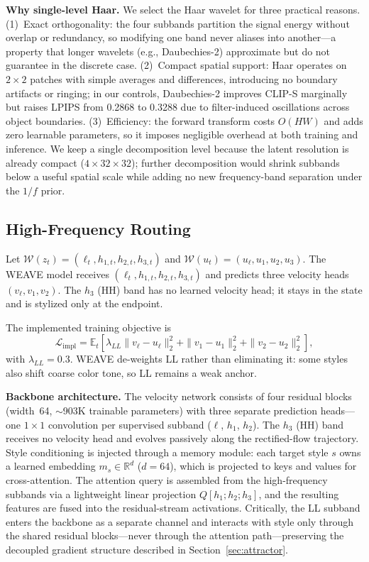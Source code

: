 \documentclass[letterpaper]{article}
\begin{document}
\textbf{Why single-level Haar.}
We select the Haar wavelet for three practical reasons.
(1)~Exact orthogonality: the four subbands partition the signal energy without overlap or redundancy, so modifying one band never aliases into another---a property that longer wavelets (e.g., Daubechies-2) approximate but do not guarantee in the discrete case.
(2)~Compact spatial support: Haar operates on $2{\times}2$ patches with simple averages and differences, introducing no boundary artifacts or ringing; in our controls, Daubechies-2 improves CLIP-S marginally but raises LPIPS from 0.2868 to 0.3288 due to filter-induced oscillations across object boundaries.
(3)~Efficiency: the forward transform costs $O(HW)$ and adds zero learnable parameters, so it imposes negligible overhead at both training and inference.
We keep a single decomposition level because the latent resolution is already compact ($4{\times}32{\times}32$); further decomposition would shrink subbands below a useful spatial scale while adding no new frequency-band separation under the $1/f$ prior.

\subsection{High-Frequency Routing}
\label{sec:baselock}

Let $\mathcal W(z_t) = (\ell_t,h_{1,t},h_{2,t},h_{3,t})$ and $\mathcal W(u_t) = (u_\ell,u_1,u_2,u_3)$.
The WEAVE model receives $(\ell_t,h_{1,t},h_{2,t},h_{3,t})$ and predicts three velocity heads $(v_\ell,v_1,v_2)$.
The $h_3$ (HH) band has no learned velocity head; it stays in the state and is stylized only at the endpoint.

The implemented training objective is
\begin{equation}
\mathcal L_{\mathrm{impl}}
=
\mathbb E_t\!\left[
\lambda_{LL}\|v_\ell-u_\ell\|_2^2
+ \|v_1-u_1\|_2^2
+ \|v_2-u_2\|_2^2
\right],
\label{eq:weave-loss}
\end{equation}
with $\lambda_{LL} = 0.3$.
WEAVE de-weights LL rather than eliminating it: some styles also shift coarse color tone, so LL remains a weak anchor.

\textbf{Backbone architecture.}
The velocity network consists of four residual blocks (width~64, $\sim$903K trainable parameters) with three separate prediction heads---one $1{\times}1$ convolution per supervised subband ($\ell$, $h_1$, $h_2$).
The $h_3$ (HH) band receives no velocity head and evolves passively along the rectified-flow trajectory.
Style conditioning is injected through a memory module: each target style $s$ owns a learned embedding $m_s \in \mathbb R^{d}$ ($d{=}64$), which is projected to keys and values for cross-attention.
The attention query is assembled from the high-frequency subbands via a lightweight linear projection $Q[h_1; h_2; h_3]$, and the resulting features are fused into the residual-stream activations.
Critically, the LL subband enters the backbone as a separate channel and interacts with style only through the shared residual blocks---never through the attention path---preserving the decoupled gradient structure described in Section~\ref{sec:attractor}.
\end{document}
